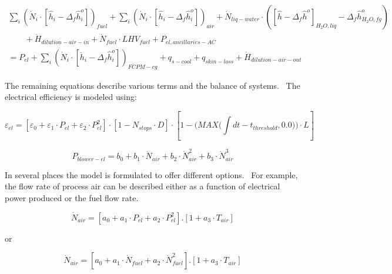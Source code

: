 \begin{equation}
  \begin{array}{l}
    {\sum\limits_i {\left( {{{\dot N}_i} \cdot \left[ {{{\hat h}_i} - {\Delta_f}\hat h_i^o} \right]} \right)}_{fuel}} + {\sum\limits_i {\left( {{{\dot N}_i} \cdot \left[ {{{\hat h}_i} - {\Delta_f}\hat h_i^o} \right]} \right)}_{air}} + {{\dot N}_{liq - water}} \cdot \left( {{{\left[ {\hat h - {\Delta_f}{{\hat h}^o}} \right]}_{{H_2}O,liq}} - {\Delta_f}\hat h_{{H_2}O,fg}^o} \right) \\
    \quad \quad  + {{\dot H}_{dilution - air - in}} + {{\dot N}_{fuel}} \cdot LH{V_{fuel}} + {P_{el,ancillaries - AC}} \\
    = {P_{el}} + {\sum\limits_i {\left( {{{\dot N}_i} \cdot \left[ {{{\ddot h}_i} - {\Delta_f}\hat h_i^o} \right]} \right)}_{FCPM - cg}} + {q_{s - cool}} + {q_{skin - loss}} + {{\dot H}_{dilution - air - out}}
  \end{array}
\end{equation}

The remaining equations describe various terms and the balance of systems.~ The electrical efficiency is modeled using:

\begin{equation}
{\varepsilon_{el}} = \left[ {{\varepsilon_0} + {\varepsilon_1} \cdot {P_{el}} + {\varepsilon_2} \cdot P_{el}^2} \right] \cdot \left[ {1 - {N_{stops}} \cdot D} \right] \cdot \left[ {1 - (MAX(\int\limits_{} {dt - {t_{threshold}},0.0))}  \cdot L} \right]
\end{equation}

\begin{equation}
{P_{blower - el}} = {b_0} + {b_1} \cdot {\dot N_{air}} + {b_2} \cdot \dot N_{air}^2 + {b_3} \cdot \dot N_{air}^3
\end{equation}

In several places the model is formulated to offer different options.~ For example, the flow rate of process air can be described either as a function of electrical power produced or the fuel flow rate.

\begin{equation}
{\dot N_{air}} = \left[ {{a_0} + {a_1} \cdot {P_{el}} + {a_2} \cdot P_{el}^2} \right].\left[ {1 + {a_3} \cdot {T_{air}}} \right]
\end{equation}

or

\begin{equation}
{\dot N_{air}} = \left[ {{a_0} + {a_1} \cdot {{\dot N}_{fuel}} + {a_2} \cdot \dot N_{fuel}^2} \right].\left[ {1 + {a_3} \cdot {T_{air}}} \right]
\end{equation}

